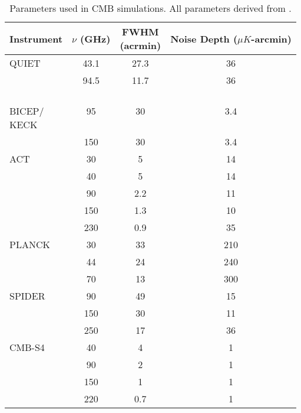\documentclass[usenatbib,hidelinks]{mnras}
\begin{document}
{{\begin{table}
\centering
\begin{tabular}{l c c c}
Instrument & \pbox{9.5cm}{\quad $\nu$ \\ (GHz)} & \pbox{9.5cm}{FWHM\\ (acrmin)} & \pbox{10cm}{Noise Depth\\ ($\mu K$-arcmin)} \\
\hline \hline
QUIET  & 43.1 & 27.3 & 36  \\
       & 94.5 & 11.7 & 36  \\ \hline
\pbox{1cm}{\ \\ BICEP/\\KECK} & 95 & 30 & 3.4\\
       & 150 & 30 & 3.4\\   \hline
ACT  & 30 & 5 & 14 \\
             & 40 & 5 & 14 \\
             & 90 & 2.2 & 11 \\
             & 150 & 1.3 & 10\\
             & 230 & 0.9 & 35 \\ \hline
PLANCK & 30   & 33   & 210 \\
       & 44   & 24   & 240 \\
       & 70   & 13   & 300 \\ \hline
SPIDER & 90   & 49   & 15 \\
	   & 150  & 30   & 11\\
	   & 250  & 17   & 36\\ \hline
CMB-S4 & 40 & 4 & 1 \\
	   & 90 & 2 & 1 \\
	   & 150 & 1 & 1 \\
	   & 220 & 0.7 & 1\\
\end{tabular}
\caption[Quiet Simulation Paramters]{\label{tab:simulation parameters} Parameters used in CMB simulations. All parameters derived from \cite{quiet_instrument,cmb-s4,spider:2013,act:2014,bicepbmode:2015,planck:2015i}.}
\end{table}


}}
\end{document}
